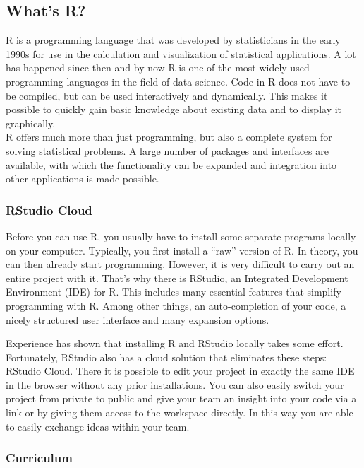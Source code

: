 \documentclass[
  11pt,
]{article}
\begin{document}
\hypertarget{whats-r}{%
\subsection{What's R?}\label{whats-r}}

R is a programming language that was developed by statisticians in the early 1990s for use in the calculation and visualization of statistical applications. A lot has happened since then and by now R is one of the most widely used programming languages in the field of data science. Code in R does not have to be compiled, but can be used interactively and dynamically. This makes it possible to quickly gain basic knowledge about existing data and to display it graphically.\\
R offers much more than just programming, but also a complete system for solving statistical problems. A large number of packages and interfaces are available, with which the functionality can be expanded and integration into other applications is made possible.

\hypertarget{rstudio-cloud}{%
\subsubsection{RStudio Cloud}\label{rstudio-cloud}}

Before you can use R, you usually have to install some separate programs locally on your computer. Typically, you first install a ``raw'' version of R. In theory, you can then already start programming. However, it is very difficult to carry out an entire project with it. That's why there is RStudio, an Integrated Development Environment (IDE) for R. This includes many essential features that simplify programming with R. Among other things, an auto-completion of your code, a nicely structured user interface and many expansion options.

Experience has shown that installing R and RStudio locally takes some effort. Fortunately, RStudio also has a cloud solution that eliminates these steps: RStudio Cloud. There it is possible to edit your project in exactly the same IDE in the browser without any prior installations. You can also easily switch your project from private to public and give your team an insight into your code via a link or by giving them access to the workspace directly. In this way you are able to easily exchange ideas within your team.

\hypertarget{curriculum}{%
\subsubsection{Curriculum}\label{curriculum}}
\end{document}
